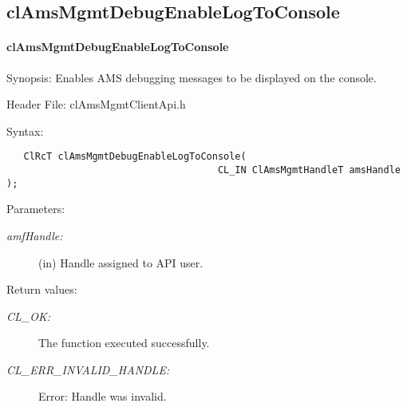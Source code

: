  \subsection{clAmsMgmtDebugEnableLogToConsole}
 \hypertarget{pageams128}{}\paragraph{cl\-Ams\-Mgmt\-Debug\-Enable\-Log\-To\-Console}\label{pageams128}
 \begin{Desc}
\item[Synopsis:]   Enables AMS debugging messages to be displayed on the console.
\end{Desc}
\begin{Desc}
\item[Header File:]clAmsMgmtClientApi.h\end{Desc}
\begin{Desc}
\item[Syntax:]

\footnotesize\begin{verbatim}   ClRcT clAmsMgmtDebugEnableLogToConsole(
                               		 CL_IN ClAmsMgmtHandleT amsHandle );
\end{verbatim}
\normalsize
\end{Desc}
\begin{Desc}
\item[Parameters:]
\begin{description}
\item[{\em amf\-Handle:}](in) Handle assigned to API user.
\end{description}
\end{Desc}
\begin{Desc}
\item[Return values:]
\begin{description}
\item[{\em CL\_\-OK:}]The function executed successfully.
\item[{\em CL\_\-ERR\_\-INVALID\_\-HANDLE:}] Error: Handle was invalid.
\end{description}
\end{Desc}
